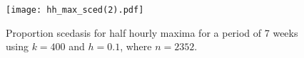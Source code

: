 
\begin{figure}
\centering
\texttt{[image: hh\_max\_sced(2).pdf]}
\caption{\label{fig:mysced_hh_max} Proportion scedasis for half hourly maxima for a period of 7 weeks using $k=400$ and $h=0.1$, where $n=2352$.}
\end{figure}


